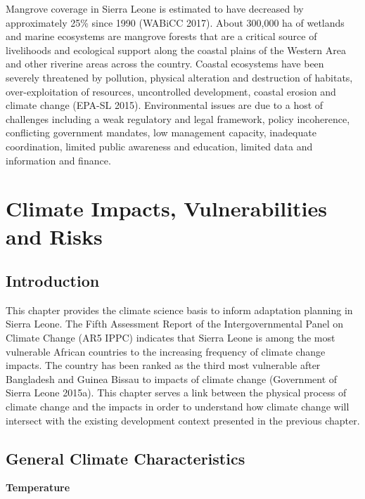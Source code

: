 \documentclass[
]{book}
\begin{document}
Mangrove coverage in Sierra Leone is estimated to have decreased by approximately 25\% since 1990 (WABiCC 2017). About 300,000 ha of wetlands and marine ecosystems are mangrove forests that are a critical source of livelihoods and ecological support along the coastal plains of the Western Area and other riverine areas across the country. Coastal ecosystems have been severely threatened by pollution, physical alteration and destruction of habitats, over-exploitation of resources, uncontrolled development, coastal erosion and climate change (EPA-SL 2015). Environmental issues are due to a host of challenges including a weak regulatory and legal framework, policy incoherence, conflicting government mandates, low management capacity, inadequate coordination, limited public awareness and education, limited data and information and finance.

\hypertarget{climate-impacts-vulnerabilities-and-risks}{%
\chapter{Climate Impacts, Vulnerabilities and Risks}\label{climate-impacts-vulnerabilities-and-risks}}

\hypertarget{introduction-2}{%
\section{Introduction}\label{introduction-2}}

This chapter provides the climate science basis to inform adaptation planning in Sierra Leone. The Fifth Assessment Report of the Intergovernmental Panel on Climate Change (AR5 IPPC) indicates that Sierra Leone is among the most vulnerable African countries to the increasing frequency of climate change impacts. The country has been ranked as the third most vulnerable after Bangladesh and Guinea Bissau to impacts of climate change (Government of Sierra Leone 2015a). This chapter serves a link between the physical process of climate change and the impacts in order to understand how climate change will intersect with the existing development context presented in the previous chapter.

\hypertarget{general-climate-characteristics}{%
\section{General Climate Characteristics}\label{general-climate-characteristics}}

\textbf{Temperature}
\end{document}
